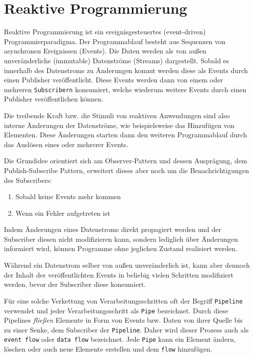 \section{Reaktive Programmierung}
\label{section:reaktive_programmierung}
Reaktive Programmierung ist ein ereignisgesteuertes (event-driven) Programmierparadigma.
Der Programmablauf besteht aus Sequenzen von asynchronen Ereignissen (Events).
Die Daten werden als von außen unveränderliche (immutable) Datenströme (Streams) dargestellt.
Sobald es innerhalb des Datenstroms zu Änderungen kommt werden diese als Events durch einen Publisher veröffentlicht.
Diese Events werden dann von einem oder mehreren \verb|Subscribern| konsumiert, welche wiederum weitere Events durch einen
Publisher veröffentlichen können.

Die treibende Kraft bzw. die Stimuli von reaktiven Anwendungen sind also interne Änderungen der Datenströme, wie beispielsweise das
Hinzufügen von Elementen.
Diese Änderungen starten dann den weiteren Programmablauf durch das Auslösen eines oder mehrerer Events.

Die Grundidee orientiert sich am Observer-Pattern und dessen Ausprägung, dem Publish-Subscribe Pattern, erweitert dieses aber
noch um die Benachrichtigungen des Subscribers:
\begin{enumerate}
  \item Sobald keine Events mehr kommen
  \item Wenn ein Fehler aufgetreten ist
\end{enumerate}
Indem Änderungen eines Datenstroms direkt propagiert werden und der Subscriber diesen nicht modifizieren kann, sondern lediglich über Änderungen informiert wird,
können Programme ohne jeglichen Zustand realisiert werden\parencite{Escoffier2017}.

Während ein Datenstrom selber von außen unveränderlich ist, kann aber dennoch der Inhalt
der veröffentlichten Events in beliebig vielen Schritten modifiziert werden, bevor der Subscriber diese konsumiert.

Für eine solche Verkettung von Verarbeitungsschritten oft der Begriff \verb|Pipeline| verwendet und jeder Verarbeitungsschritt als \verb|Pipe| bezeichnet.
Durch diese Pipelines \textit{fließen} Elemente in Form von Events bzw. Daten von ihrer Quelle
bis zu einer Senke, dem Subscriber der \verb|Pipeline|.
Daher wird dieser Prozess auch als \verb|event flow| oder \verb|data flow| bezeichnet.
Jede \verb|Pipe| kann ein Element ändern, löschen oder auch neue Elemente erstellen und dem \verb|flow| hinzufügen.

